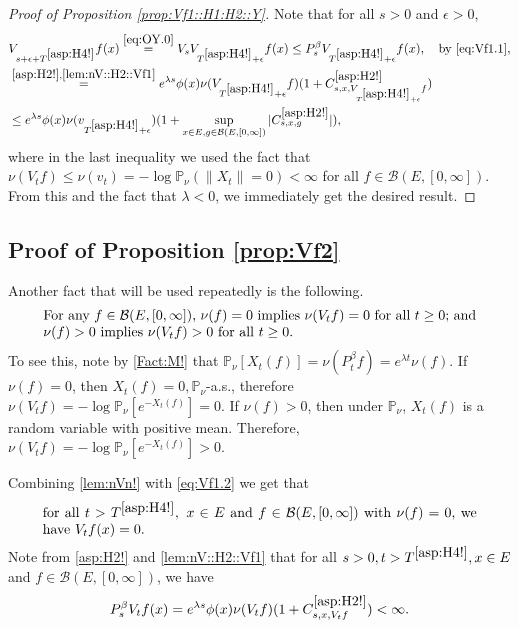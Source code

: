\documentclass[12pt,a4paper]{amsart}
\numberwithin{equation}{section}
\theoremstyle{plain}
\theoremstyle{definition}
\theoremstyle{remark}
\begin{document}
\begin{proof}[{Proof of Proposition \ref{prop:Vf1::H1:H2::Y}}]
	Note that for all $s>0$ and $\epsilon>0$,
\begin{align}
	& V_{s+\epsilon +T^{\eqref{asp:H4!}}} f (x)
	\overset{\eqref{eq:OY.0}}= V_s V_{T^{\eqref{asp:H4!}}+\epsilon} f(x)
	\leq P_s^\beta V_{T^{\eqref{asp:H4!}} + \epsilon} f(x),\quad\text{by \eqref{eq:Vf1.1}},
 	\\ \label{eq:Vf1.2} & \overset{\eqref{asp:H2!},\eqref{lem:nV::H2::Vf1}}= e^{\lambda s}\phi(x) \nu( V_{T^{\eqref{asp:H4!}} +\epsilon} f)  (1+ C^{\eqref{asp:H2!}}_{s,x,V_{T^{\eqref{asp:H4!}} + \epsilon} f})
	\\&\leq e^{\lambda s}\phi(x) \nu(v_{T^{\eqref{asp:H4!}} +\epsilon})  (1+ \sup_{x\in E, g\in \mathcal B(E,[0,\infty])}|C^{\eqref{asp:H2!}}_{s,x,g}|), 
\end{align}
	where
	in the last inequality we used the fact that $\nu(V_t f) \leq \nu(v_t)   = - \log \mathbb P_\nu (\|X_t\| = 0)  < \infty$  for all  $f\in \mathcal B(E,[0,\infty])$.
	From this and the fact that $\lambda < 0$, we immediately get the desired result.
\end{proof}

\subsection{Proof of Proposition \ref{prop:Vf2}} \label{sec:Vf2}
	Another fact that will be used repeatedly is the following.
\begin{equation}
\begin{minipage}{0.9\textwidth}
	For any $f\in \mathcal B(E,[0,\infty])$, $\nu(f) = 0$ implies $\nu(V_tf)=0$ for all $t\ge 0$; and $\nu(f)>0$ implies $\nu(V_tf)>0$ for all $t\ge 0$.
\end{minipage}\label{lem:nVn!}
\end{equation}
	To see this, note by \eqref{Fact:M!} that $ \mathbb P_\nu[X_t(f)] = \nu (P_t^\beta f) = e^{\lambda t}\nu (f). $
	If $\nu(f) = 0$, then $X_t(f)=0, \mathbb P_\nu$-a.s., therefore $\nu(V_t f) = - \log \mathbb P_\nu[e^{-X_t(f)}] =0. $
	If $\nu(f) > 0$, then under $\mathbb P_\nu$, $X_t(f)$ is a random variable with positive mean.
	Therefore, $ \nu(V_tf) = - \log \mathbb P_\nu[e^{-X_t(f)}] >0$.

	Combining \eqref{lem:nVn!} with \eqref{eq:Vf1.2} we get that
\begin{equation}
\begin{minipage}{0.9\textwidth}
	for all $t>T^{\eqref{asp:H4!}},~x\in E$ and $f \in \mathcal B(E,[0,\infty])$ with $\nu(f) = 0$, we have $V_t f(x ) = 0$.
\end{minipage} \label{lem:nullVf}
\end{equation}
Note  from \eqref{asp:H2!} and \eqref{lem:nV::H2::Vf1} that for all $s>0, t> T^{\eqref{asp:H4!}}, x\in E$ and $f\in \mathcal B(E,[0,\infty])$, we have
\begin{equation}
	P_s^\beta V_tf(x)  =e^{\lambda s} \phi(x)\nu(V_tf) (1+C^{\eqref{asp:H2!}}_{s,x,V_tf}) <\infty.
\label{lem:PV}
\end{equation}
\end{document}
